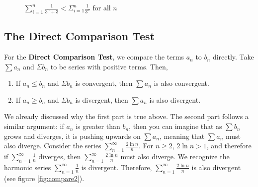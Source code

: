 \begin{figure}
    \centering
    \caption{$\sum_{i=1}^n \frac{1}{3^n + 3} < \Sigma_{i = 1}^n 
    \frac{1}{3^n}$ for all $n$}
    \label{fig:compare1}
\end{figure}
\subsection{The Direct Comparison Test}
For the \textbf{Direct Comparison Test}, we compare the terms $a_n$ to $b_n$ 
directly. Take $\sum a_n$ and $\Sigma b_n$ to be series with positive terms. 
Then, 
\begin{enumerate}
\item If $a_n \leq b_n$ and $\Sigma b_n$ is convergent, then $\sum a_n$ is 
also convergent.
\item If $a_n \geq b_n$ and $\Sigma b_n$ is divergent, then $\sum a_n$ is 
also divergent.
\end{enumerate}

We already discussed why the first part is true above. The second part follows 
a similar argument: if $a_n$ is greater than $b_n$, then you can imagine that 
as $\sum b_n$ grows and diverges, it is pushing upwards on $\sum a_n$, 
meaning that $\sum a_n$ must also diverge. Consider the series $\sum_{n=1}^
\infty \frac{2\ln{n}}{n}$. For $n \geq 2$, $2\ln{n} > 1$, and therefore if 
$\sum_{n=1}^\infty \frac{1}{n}$ diverges, then $\sum_{n=1}^\infty \frac{2
\ln{n}}{n}$ must also diverge. We recognize the harmonic series $\sum_{n=1}^
\infty \frac{1}{n}$ is divergent. Therefore, $\sum_{n=1}^\infty 
\frac{2\ln{n}}{n}$ is also divergent (see figure \ref{fig:compare2}).

